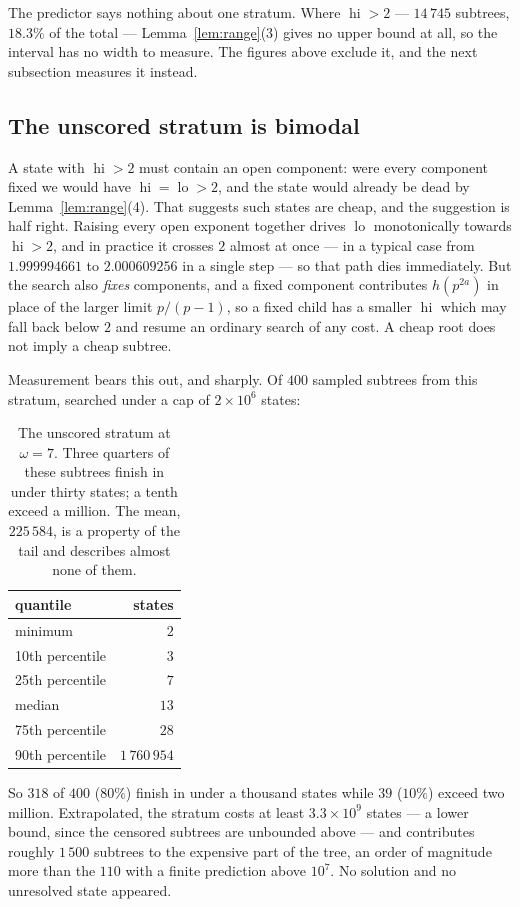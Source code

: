 \documentclass[11pt]{amsart}
\theoremstyle{remark}
\DeclareMathOperator{\lo}{lo}
\DeclareMathOperator{\hi}{hi}
\begin{document}
The predictor says nothing about one stratum. Where $\hi > 2$ ---
$14\,745$ subtrees, $18.3\%$ of the total --- Lemma~\ref{lem:range}(3) gives no
upper bound at all, so the interval has no width to measure. The figures above
exclude it, and the next subsection measures it instead.

\subsection{The unscored stratum is bimodal}\label{sec:hi2}
A state with $\hi > 2$ must contain an open component: were every component
fixed we would have $\hi = \lo > 2$, and the state would already be dead by
Lemma~\ref{lem:range}(4). That suggests such states are cheap, and the suggestion
is half right. Raising every open exponent together drives $\lo$ monotonically
towards $\hi > 2$, and in practice it crosses $2$ almost at once --- in a typical
case from $1.999994661$ to $2.000609256$ in a single step --- so that path dies
immediately. But the search also \emph{fixes} components, and a fixed component
contributes $h(p^{2a})$ in place of the larger limit $p/(p-1)$, so a fixed child
has a smaller $\hi$ which may fall back below $2$ and resume an ordinary search of
any cost. A cheap root does not imply a cheap subtree.

Measurement bears this out, and sharply. Of $400$ sampled subtrees from this
stratum, searched under a cap of $2 \times 10^{6}$ states:

\begin{table}[h]
\centering
\begin{tabular}{lr}
\toprule
quantile & states \\
\midrule
minimum          & $2$ \\
10th percentile  & $3$ \\
25th percentile  & $7$ \\
median           & $13$ \\
75th percentile  & $28$ \\
90th percentile  & $1\,760\,954$ \\
\bottomrule
\end{tabular}
\caption{The unscored stratum at $\omega = 7$. Three quarters of these subtrees
finish in under thirty states; a tenth exceed a million. The mean, $225\,584$, is
a property of the tail and describes almost none of them.}
\end{table}

So $318$ of $400$ ($80\%$) finish in under a thousand states while $39$
($10\%$) exceed two million. Extrapolated, the stratum costs at least
$3.3 \times 10^{9}$ states --- a lower bound, since the censored subtrees are
unbounded above --- and contributes roughly $1\,500$ subtrees to the expensive
part of the tree, an order of magnitude more than the $110$ with a finite
prediction above $10^{7}$. No solution and no unresolved state appeared.
\end{document}
